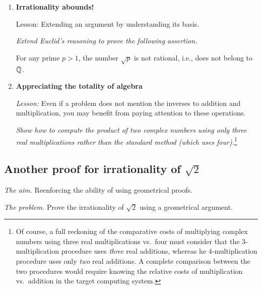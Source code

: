 \begin{enumerate}
\item
{\bf Irrationality abounds!}

{\sc Lesson:} Extending an argument by understanding its basis.

\smallskip

{\em Extend Euclid's reasoning to prove the following assertion.}


\begin{prop}
For any prime $p >1$, the number $\sqrt{p}$ is not rational, i.e., does not belong to $\mathbb{Q}$.
\end{prop}

\item
{\bf Appreciating the totality of algebra}

{\em Lesson:} Even if a problem does not mention the inverses to addition and multiplication, you may benefit from paying attention to these operations.

\smallskip


{\em Show how to compute the product of two complex numbers using only {\em three}
real multiplications rather than the standard method (which uses four).}\footnote{Of course, a full reckoning of the comparative costs of multiplying complex numbers using three real multiplications vs.~four must consider that the $3$-multiplication procedure uses {\em three} real additions, whereas he $4$-multiplication procedure uses only {\em two} real additions.  A complete comparison between the two procedures would require knowing the relative costs of multiplication vs.~addition in the target computing system.}

\end{enumerate}







\subsection{Another proof for irrationality of $\sqrt{2}$}

\noindent \textit{The aim.}
Reenforcing the ability of using geometrical proofs.
\medskip

\noindent \textit{The problem.}
Prove the irrationality of $\sqrt{2}$ using a geometrical argument.
\medskip

